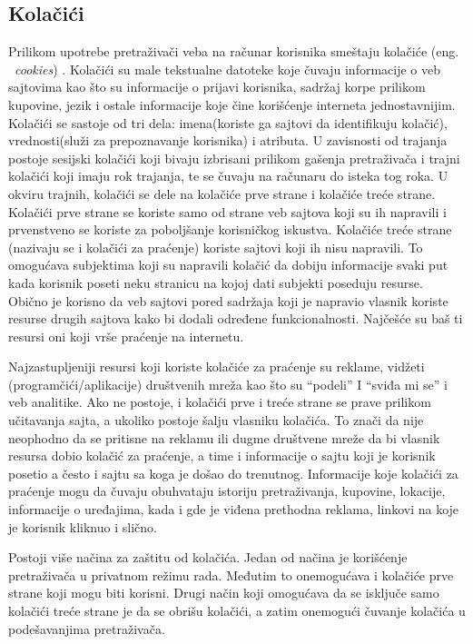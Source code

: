 \documentclass[a4paper]{article}
\begin{document}
\subsection{Kolačići}

Prilikom upotrebe pretraživači veba na računar korisnika smeštaju kolačiće (eng. ~{\em cookies}) \cite{cookies1}. Kolačići su male tekstualne datoteke koje čuvaju informacije o veb sajtovima kao što su informacije o prijavi korisnika, sadržaj korpe prilikom kupovine, jezik i ostale informacije koje čine korišćenje interneta jednostavnijim. Kolačići se sastoje od tri dela: imena(koriste ga sajtovi da identifikuju kolačić), vrednosti(služi za prepoznavanje korisnika) i atributa. U zavisnosti od trajanja postoje sesijski kolačići koji bivaju izbrisani prilikom gašenja pretraživača i trajni kolačići koji imaju rok trajanja, te se čuvaju na računaru do isteka tog roka. U okviru trajnih, kolačići se dele na kolačiće prve strane i kolačiće treće strane. Kolačići prve strane se koriste samo od strane veb sajtova koji su ih napravili i prvenstveno se koriste za poboljšanje korisničkog iskustva. Kolačiće treće strane (nazivaju se i kolačići za praćenje) koriste sajtovi koji ih nisu napravili. To omogućava subjektima koji su napravili kolačić da dobiju informacije svaki put kada korisnik poseti neku stranicu na kojoj dati subjekti poseduju resurse. Obično je korisno da veb sajtovi pored sadržaja koji je napravio vlasnik koriste resurse drugih sajtova kako bi dodali određene funkcionalnosti. Najčešće su baš ti resursi oni koji vrše praćenje na internetu. 
\par Najzastupljeniji resursi koji koriste kolačiće za praćenje su reklame, vidžeti (programčići/aplikacije) društvenih mreža kao što su “podeli” I “sviđa mi se” i veb analitike. Ako ne postoje, i kolačići prve i treće strane se prave prilikom učitavanja sajta, a ukoliko postoje šalju vlasniku kolačića. To znači da nije neophodno da se pritisne na reklamu ili dugme društvene mreže da bi vlasnik resursa dobio kolačić za praćenje, a time i informacije o sajtu koji je korisnik posetio a često i sajtu sa koga je došao do trenutnog. Informacije koje kolačići za praćenje mogu da čuvaju obuhvataju istoriju pretraživanja, kupovine, lokacije, informacije o uređajima, kada i gde je viđena prethodna reklama, linkovi na koje je korisnik kliknuo i slično. 
\par Postoji više načina za zaštitu od kolačića. Jedan od načina je korišćenje pretraživača u privatnom režimu rada. Međutim to onemogućava i kolačiće prve strane koji mogu biti korisni. Drugi način koji omogućava da se isključe samo kolačići treće strane je da se obrišu kolačići, a zatim onemogući čuvanje kolačića u podešavanjima pretraživača. 
\end{document}
